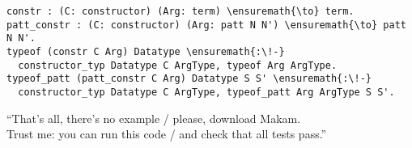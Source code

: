 \begin{verbatim}
constr : (C: constructor) (Arg: term) \ensuremath{\to} term.
patt_constr : (C: constructor) (Arg: patt N N') \ensuremath{\to} patt N N'.
typeof (constr C Arg) Datatype \ensuremath{:\!-}
  constructor_typ Datatype C ArgType, typeof Arg ArgType.
typeof_patt (patt_constr C Arg) Datatype S S' \ensuremath{:\!-}
  constructor_typ Datatype C ArgType, typeof_patt Arg ArgType S S'.
\end{verbatim}

\begin{versy}
``That's all, there's no example / please, download Makam. \\
Trust me: you can run this code / and check that all tests pass.''
\end{versy}
